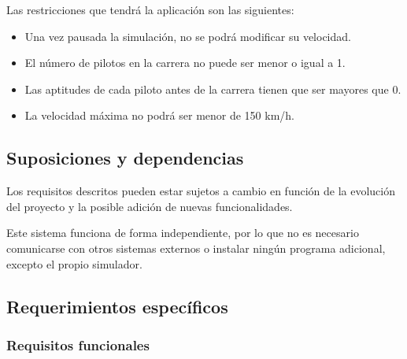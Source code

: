 Las restricciones que tendrá la aplicación son las siguientes:

\begin{itemize}
    \item Una vez pausada la simulación, no se podrá modificar su velocidad.
    \item El número de pilotos en la carrera no puede ser menor o igual a 1.
    \item Las aptitudes de cada piloto antes de la carrera tienen que ser mayores que 0.
    \item La velocidad máxima no podrá ser menor de 150 km/h.
\end{itemize}

\subsection{Suposiciones y dependencias}

Los requisitos descritos pueden estar sujetos a cambio en función de la evolución del proyecto y la posible adición de nuevas funcionalidades. 

Este sistema funciona de forma independiente, por lo que no es necesario comunicarse con otros sistemas externos o instalar ningún programa adicional, excepto el propio simulador.

\subsection{Requerimientos específicos}

\subsubsection{Requisitos funcionales}